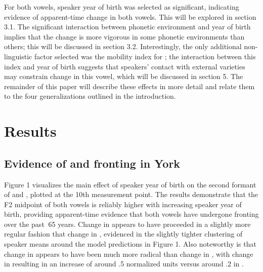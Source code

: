 \documentclass[12pt]{article}
\begin{document}
For both vowels, speaker year of birth was selected as significant, indicating evidence of apparent-time change in both vowels. This will be explored in section 3.1. The significant interaction between phonetic environment and year of birth implies that the change is more vigorous in some phonetic environments than others; this will be discussed in section 3.2. Interestingly, the only additional non-linguistic factor selected was the mobility index for ; the interaction between this index and year of birth suggests that speakers' contact with external varieties may constrain change in this vowel, which will be discussed in section 5. The remainder of this paper will describe these effects in more detail and relate them to the four generalizations outlined in the introduction.

\section{Results}
\subsection{Evidence of  and  fronting in York}
Figure 1 visualizes the main effect of speaker year of birth on the second formant of  and , plotted at the 10th measurement point. The results demonstrate that the F2 midpoint of both vowels is reliably higher with increasing speaker year of birth, providing apparent-time evidence that both vowels have undergone fronting over the past $~$65 years. Change in  appears to have proceeded in a slightly more regular fashion that change in , evidenced in the slightly tighter clustering of speaker means around the model predictions in Figure 1.  Also noteworthy is that change in  appears to have been much more radical than change in , with change in  resulting in an increase of around .5 normalized units versus around .2 in . 
\end{document}
